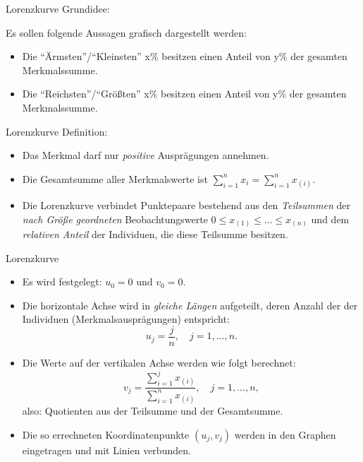 \documentclass[
  10pt,
  ignorenonframetext,
]{beamer}
\providecommand{\tightlist}{%
  \setlength{\itemsep}{0pt}\setlength{\parskip}{0pt}}
\begin{document}
\begin{frame}{Lorenzkurve}
\label{lorenzkurve}
Grundidee:

Es sollen folgende Aussagen grafisch dargestellt werden:

\begin{itemize}
\tightlist
\item
  Die ``Ärmsten''/``Kleinsten'' x\% besitzen einen Anteil von y\% der
  gesamten Merkmalssumme.
\item
  Die ``Reichsten''/``Größten'' x\% besitzen einen Anteil von y\% der
  gesamten Merkmalssumme.
\end{itemize}
\end{frame}

\begin{frame}{Lorenzkurve}
\label{lorenzkurve-1}
Definition:

\begin{itemize}
\tightlist
\item
  Das Merkmal darf nur \emph{positive} Ausprägungen annehmen.
\item
  Die Gesamtsumme aller Merkmalswerte ist
  \(\sum_{i=1}^n x_i=\sum_{i=1}^n x_{(i)}\).
\item
  Die Lorenzkurve verbindet Punktepaare bestehend aus den
  \emph{Teilsummen} der \emph{nach Größe geordneten} Beobachtungswerte
  \(0 \leq
   x_{(1)} \leq \ldots \leq x_{(n)}\) und dem \emph{relativen Anteil}
  der Individuen, die diese Teilsumme besitzen.
\end{itemize}
\end{frame}

\begin{frame}{Lorenzkurve}
\label{lorenzkurve-2}
\begin{itemize}
\tightlist
\item
  Es wird festgelegt: \(u_{0} = 0\) und \(v_{0} = 0\).
\item
  Die horizontale Achse wird in \emph{gleiche Längen} aufgeteilt, deren
  Anzahl der der Individuen (Merkmalsausprägungen) entspricht: \[
                   u_{j} = \frac{j}{n}, \quad j = 1, ..., n.
               \]
\item
  Die Werte auf der vertikalen Achse werden wie folgt berechnet: \[
                   v_{j} = \frac{\sum_{i=1}^{j} x_{(i)}}{\sum_{i=1}^{n} x_{(i)}}, \quad j = 1, ..., n,
               \] also: Quotienten aus der Teilsumme und der
  Gesamtsumme.
\item
  Die so errechneten Koordinatenpunkte \((u_j,v_j)\) werden in den
  Graphen eingetragen und mit Linien verbunden.
\end{itemize}
\end{frame}
\end{document}
